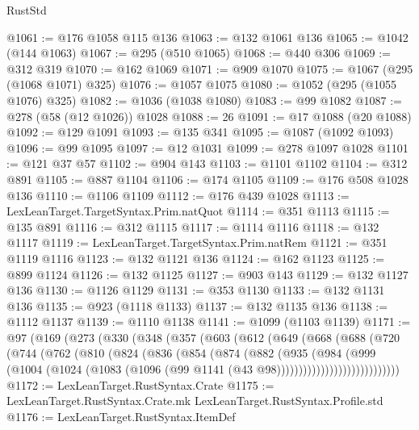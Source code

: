\begin{lexlean}{RustStd}
\begin{coremodule}
{\begin{coremodule}
{{{{{{{{{{{{{{{{{{{{{{{{{{{{{{{@1061 := @176 @1058 @115 @136
@1063 := @132 @1061 @136
@1065 := @1042 (@144 @1063)
@1067 := @295 (@510 @1065)
@1068 := @440 @306
@1069 := @312 @319
@1070 := @162 @1069
@1071 := @909 @1070
@1075 := @1067 (@295 (@1068 @1071) @325)
@1076 := @1057 @1075
@1080 := @1052 (@295 (@1055 @1076) @325)
@1082 := @1036 (@1038 @1080)
@1083 := @99 @1082
@1087 := @278 (@58 (@12 @1026)) @1028
@1088 := 26
@1091 := @17 @1088 (@20 @1088)
@1092 := @129 @1091
@1093 := @135 @341
@1095 := @1087 (@1092 @1093)
@1096 := @99 @1095
@1097 := @12 @1031
@1099 := @278 @1097 @1028
@1101 := @121 @37 @57
@1102 := @904 @143
@1103 := @1101 @1102
@1104 := @312 @891
@1105 := @887 @1104
@1106 := @174 @1105
@1109 := @176 @508 @1028 @136
@1110 := @1106 @1109
@1112 := @176 @439 @1028
@1113 := LexLeanTarget.TargetSyntax.Prim.natQuot
@1114 := @351 @1113
@1115 := @135 @891
@1116 := @312 @1115
@1117 := @1114 @1116
@1118 := @132 @1117
@1119 := LexLeanTarget.TargetSyntax.Prim.natRem
@1121 := @351 @1119 @1116
@1123 := @132 @1121 @136
@1124 := @162 @1123
@1125 := @899 @1124
@1126 := @132 @1125
@1127 := @903 @143
@1129 := @132 @1127 @136
@1130 := @1126 @1129
@1131 := @353 @1130
@1133 := @132 @1131 @136
@1135 := @923 (@1118 @1133)
@1137 := @132 @1135 @136
@1138 := @1112 @1137
@1139 := @1110 @1138
@1141 := @1099 (@1103 @1139)
@1171 := @97
    (@169
      (@273
        (@330
          (@348
            (@357
              (@603
                (@612
                  (@649
                    (@668
                      (@688
                        (@720
                          (@744
                            (@762
                              (@810
                                (@824
                                  (@836
                                    (@854
                                      (@874
                                        (@882
                                          (@935
                                            (@984
                                              (@999
                                                (@1004
                                                  (@1024
                                                    (@1083
                                                      (@1096
                                                        (@99
                                                          @1141
                                                          (@43 @98))))))))))))))))))))))))))))
@1172 := LexLeanTarget.RustSyntax.Crate
@1175 := LexLeanTarget.RustSyntax.Crate.mk LexLeanTarget.RustSyntax.Profile.std
@1176 := LexLeanTarget.RustSyntax.ItemDef
}}}}}}}}}}}}}}}}}}}}}}}}}}}}}}}
\end{coremodule}}
\end{coremodule}
\end{lexlean}
